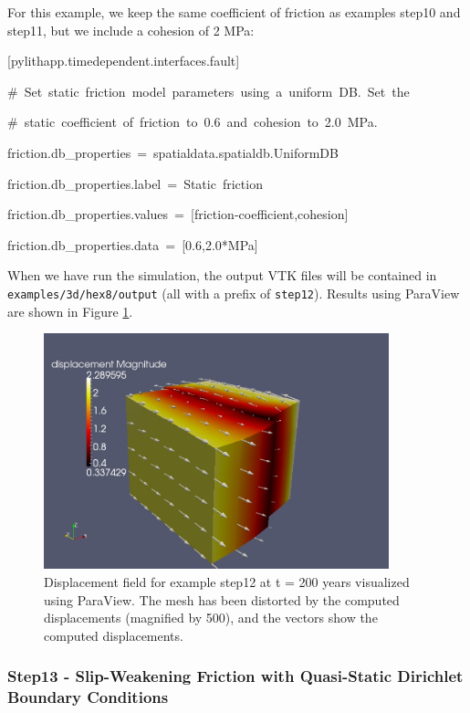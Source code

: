 For this example, we keep the same coefficient of friction as examples
step10 and step11, but we include a cohesion of 2 MPa:
\begin{lyxcode}
{[}pylithapp.timedependent.interfaces.fault{]}

\#~Set~static~friction~model~parameters~using~a~uniform~DB.~Set~the

\#~static~coefficient~of~friction~to~0.6~and~cohesion~to~2.0~MPa.

friction.db\_properties~=~spatialdata.spatialdb.UniformDB

friction.db\_properties.label~=~Static~friction

friction.db\_properties.values~=~{[}friction-coefficient,cohesion{]}

friction.db\_properties.data~=~{[}0.6,2.0{*}MPa{]}
\end{lyxcode}
When we have run the simulation, the output VTK files will be contained
in \texttt{examples/3d/hex8/output} (all with a prefix of \texttt{step12}).
Results using ParaView are shown in Figure \ref{fig:step12-displ-t200}.

\begin{figure}
\begin{centering}
\includegraphics[width=10cm]{tutorials/3dhex8/figs/step12-displ-t200}
\par\end{centering}

\caption{Displacement field for example step12 at t = 200 years visualized
using ParaView. The mesh has been distorted by the computed displacements
(magnified by 500), and the vectors show the computed displacements.\label{fig:step12-displ-t200}}
\end{figure}



\subsubsection{Step13 - Slip-Weakening Friction with Quasi-Static Dirichlet Boundary
Conditions}

